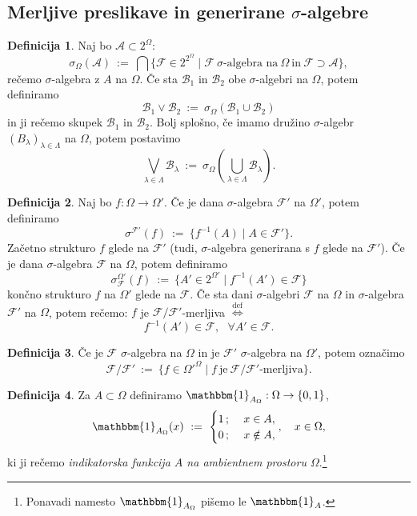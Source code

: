 \documentclass[11pt]{article}
\newcommand{\A}{\mathcal{A}}
\newcommand{\B}{\mathcal{B}}
\newcommand{\F}{\mathcal{F}}
\newcommand{\diff}{\overset{\text{def}}{\iff}}
\newcommand{\set}[1]{\{#1\}}
\newcommand{\oklepaj}[1]{\left(#1\right)}
\newcommand{\1}{\mathbbm{1}}
\theoremstyle{definition}
\newtheorem{definicija}{Definicija}[section]
\theoremstyle{definition}
\theoremstyle{definition}
\theoremstyle{definition}
\begin{document}
\subsection{Merljive preslikave in generirane $\sigma$-algebre}
\vspace{0.5cm}

\begin{definicija}

Naj bo $\A \subset 2^\Omega$:
$$\sigma_\Omega(\A) ~:=~ \bigcap\set{\F \in 2^{2^\Omega} \mid \F ~\sigma\text{-algebra na}~\Omega~\text{in}~\F\supset\A},$$
rečemo $\sigma$-algebra z $A$ na $\Omega$. Če sta $\B_1$ in $\B_2$ obe $\sigma$-algebri na $\Omega$, potem definiramo
$$\B_1 \vee \B_2 ~:=~ \sigma_\Omega(\B_1 \cup \B_2)$$
in ji rečemo skupek $\B_1$ in $\B_2$. Bolj splošno, če imamo družino $\sigma$-algebr $(B_\lambda)_{\lambda\in\Lambda}$ na $\Omega$, potem postavimo
$$\bigvee_{\lambda\in\Lambda} \B_\lambda ~:=~ \sigma_\Omega\oklepaj{\bigcup_{\lambda\in\Lambda} \B_\lambda}.$$

\end{definicija}
\vspace{0.5cm}

\begin{definicija}

Naj bo $f: \Omega \rightarrow \Omega'$. Če je dana $\sigma$-algebra $\F'$ na $\Omega'$, potem definiramo
$$\sigma^{\F'}(f) ~:=~ \set{f^{-1}(A) \mid A \in \F'}.$$
Začetno strukturo $f$ glede na $\F'$ (tudi, $\sigma$-algebra generirana s $f$ glede na $\F'$). Če je dana $\sigma$-algebra $\F$ na $\Omega$, potem definiramo
$$\sigma_\F^{\Omega'}(f) ~:=~ \set{A' \in 2^{\Omega'} \mid f^{-1}(A') \in \F}$$
končno strukturo $f$ na $\Omega'$ glede na $\F$. Če sta dani $\sigma$-algebri $\F$ na $\Omega$ in $\sigma$-algebra $\F'$ na $\Omega$, potem rečemo: $f$ je $\F/\F'$-merljiva $\diff$
$$f^{-1}(A') \in \F, ~~~\forall A' \in \F.$$

\end{definicija}
\vspace{0.5cm}

\begin{definicija}

Če je $\F$ $\sigma$-algebra na $\Omega$ in je $\F'$ $\sigma$-algebra na $\Omega'$, potem označimo
$$\F/\F' ~:=~ \set{f \in \Omega'^\Omega \mid f ~\text{je}~ \F/\F'\text{-merljiva}}.$$

\end{definicija}
\vspace{0.5cm}

\begin{definicija}

Za $A \subset \Omega$ definiramo $\1_{A_\Omega}: \Omega \rightarrow \set{0,1}$,
$$\1_{A_\Omega}(x) ~:=~ \begin{cases}
1\,; ~&x \in A, \\
0\,; ~&x \notin A,
\end{cases}, ~~~x \in \Omega,$$
ki ji rečemo \textit{indikatorska funkcija $A$ na ambientnem prostoru $\Omega$}.\footnote{Ponavadi namesto $\1_{A_\Omega}$ pišemo le $\1_A$.}

\end{definicija}
\vspace{0.5cm}
\end{document}

